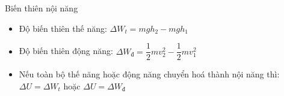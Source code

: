 \begin{dang}{Biến thiên nội năng}
\begin{itemize}
\item Độ biến thiên thế năng: $\Delta W_t=mgh_2-mgh_1$
\item Độ biến thiên động năng: $\Delta W_{\text{đ}}=\dfrac{1}{2}mv_2^2-\dfrac{1}{2}mv_1^2$
\item Nếu toàn bộ thế năng hoặc động năng chuyển hoá thành nội năng thì: $\Delta U=\Delta W_t$ hoặc $\Delta U=\Delta W_\text{đ}$
\end{itemize}
\end{dang}
